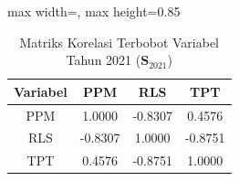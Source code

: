 \begin{table}[H]
\centering
\caption{Matriks Korelasi Terbobot Variabel Tahun 2021 ($\mathbf{S}_{2021}$)} \label{tab:sample1matriks_intra_loading_2021}
\begin{adjustbox}{max width=\textwidth, max height=0.85\textheight}
\begin{tabular}{|c|c|c|c|}
\hline
\textbf{Variabel} & \textbf{PPM} & \textbf{RLS} & \textbf{TPT} \\
\hline
PPM & 1.0000 & -0.8307 & 0.4576 \\
RLS & -0.8307 & 1.0000 & -0.8751 \\
TPT & 0.4576 & -0.8751 & 1.0000 \\
\hline
\end{tabular}
\end{adjustbox}
\end{table}